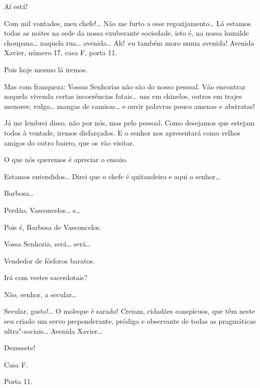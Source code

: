 \begin{linenumbers}
 Aí está!

 Com mil
vontades, meu chefe!\ldots{} Não me furto a esse
regozijamento\ldots{} Lá estamos todas as noites na sede
da nossa exuberante sociedade, isto é, na nossa
humilde choupana\ldots{} naquela rua\ldots{} avenida\ldots{} Ah!~eu também
moro numa avenida! Avenida Xavier, número
17, casa F, porta 11.

 Pois hoje mesmo lá
iremos.

 Mas com
franqueza: Vossas Senhorias não são do nosso pessoal.
Vão encontrar naquela vivenda certas
incoerências fatais\ldots{} uns em chinelos, outros em
trajes menores; vulgo\ldots{} mangas de camisas\ldots{} e ouvir palavras pouco
amenas e abstratas!

 Já me lembrei
disso, não por nós, mas pelo pessoal. Como desejamos
que estejam todos à vontade, iremos
disfarçados. E o senhor nos apresentará
como velhos amigos do outro bairro, que os vão
visitar.

 O que nós queremos é
apreciar o ensaio.

 Estamos
entendidos\ldots{} Direi que o chefe é quitandeiro e aqui
o senhor\ldots{}

  
Barbosa\ldots{}

 Perdão,
Vasconcelos\ldots{} s\ldots{}

 
Pois é, Barbosa de
Vasconcelos.

 Vossa Senhoria,
será\ldots{} será\ldots{}

 Vendedor de fósforos baratos.

 Irá com vestes
sacerdotais?

 Não, senhor, a secular\ldots{}

 Secular,
gosto!\ldots{} O moleque é sarado! 
Creiam, cidadães conspícuos,
que têm neste seu criado um servo
preponderante, pródigo e observante de todas as
pragmáticas ultra"-sociais\ldots{} Avenida Xavier\ldots{}

 Dezessete!

 Casa F.

 Porta 11. 





\end{linenumbers}
